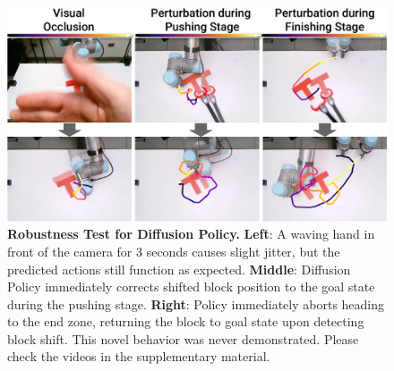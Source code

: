 \begin{figure}[t]
\centering
\includegraphics[width=\linewidth]{figure/real_robustness.pdf}

\caption{\textbf{Robustness Test for Diffusion Policy.} 
\label{fig:robustness}
\textbf{Left}: A waving hand in front of the camera for 3 seconds causes slight jitter, but the predicted actions still function as expected. 
\textbf{Middle}: Diffusion Policy immediately corrects shifted block position to the goal state during the pushing stage.
\textbf{Right}: Policy immediately aborts heading to the end zone, returning the block to goal state upon detecting block shift. This novel behavior was never demonstrated.
Please check the videos in the supplementary material. }

\vspace{-4mm}
\end{figure}

